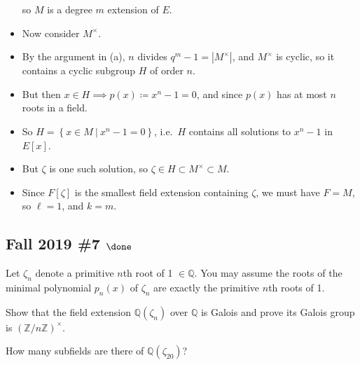 \begin{solution}
\begin{itemize}
  so \(M\) is a degree \(m\) extension of \(E\).
\item
  Now consider \(M^{\times}\).
\item
  By the argument in (a), \(n\) divides
  \(q^m - 1 = {\left\lvert {M^{\times}} \right\rvert}\), and
  \(M^{\times}\) is cyclic, so it contains a cyclic subgroup \(H\) of
  order \(n\).
\item
  But then \(x\in H \implies p(x)\coloneqq x^n-1 = 0\), and since
  \(p(x)\) has at most \(n\) roots in a field.
\item
  So \(H = \left\{{x \in M {~\mathrel{\Big|}~}x^n-1 = 0}\right\}\),
  i.e.~\(H\) contains all solutions to \(x^n-1\) in \(E[x]\).
\item
  But \(\zeta\) is one such solution, so
  \(\zeta \in H \subset M^{\times}\subset M\).
\item
  Since \(F[\zeta]\) is the smallest field extension containing
  \(\zeta\), we must have \(F = M\), so \(\ell = 1\), and \(k = m\).
\end{itemize}

\end{solution}

\hypertarget{fall-2019-7-done}{%
\subsection{\texorpdfstring{Fall 2019 \#7
\(\done\)}{Fall 2019 \#7 \textbackslash done}}\label{fall-2019-7-done}}

Let \(\zeta_n\) denote a primitive \(n\)th root of 1
\(\in {\mathbb{Q}}\). You may assume the roots of the minimal polynomial
\(p_n(x)\) of \(\zeta_n\) are exactly the primitive \(n\)th roots of 1.

Show that the field extension \({\mathbb{Q}}(\zeta_n )\) over
\({\mathbb{Q}}\) is Galois and prove its Galois group is
\(({\mathbb{Z}}/n{\mathbb{Z}})^{\times}\).

How many subfields are there of \({\mathbb{Q}}(\zeta_{20} )\)?

